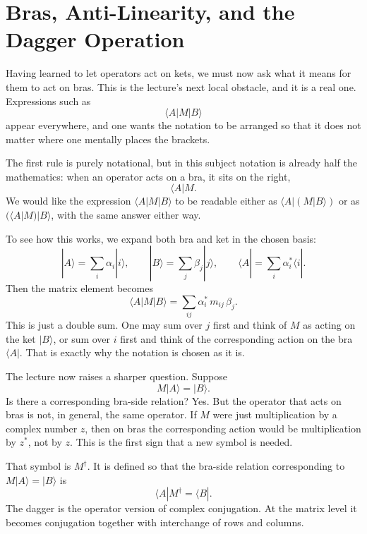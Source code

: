 \section{Bras, Anti-Linearity, and the Dagger Operation}

Having learned to let operators act on kets, we must now ask what it means for them to act on bras. This is the lecture's next local obstacle, and it is a real one. Expressions such as
\begin{equation}
\langle A|M|B\rangle
\end{equation}
appear everywhere, and one wants the notation to be arranged so that it does not matter where one mentally places the brackets.

The first rule is purely notational, but in this subject notation is already half the mathematics: when an operator acts on a bra, it sits on the right,
\begin{equation}
\langle A|M.
\end{equation}
We would like the expression \(\langle A|M|B\rangle\) to be readable either as \(\langle A|(M|B\rangle)\) or as \((\langle A|M)|B\rangle\), with the same answer either way.

To see how this works, we expand both bra and ket in the chosen basis:
\begin{equation}
|A\rangle=\sum_i \alpha_i |i\rangle,
\qquad
|B\rangle=\sum_j \beta_j |j\rangle,
\qquad
\langle A|=\sum_i \alpha_i^* \langle i|.
\end{equation}
Then the matrix element becomes
\begin{equation}
\langle A|M|B\rangle
=
\sum_{ij}\alpha_i^*\,m_{ij}\,\beta_j.
\end{equation}
This is just a double sum. One may sum over \(j\) first and think of \(M\) as acting on the ket \(|B\rangle\), or sum over \(i\) first and think of the corresponding action on the bra \(\langle A|\). That is exactly why the notation is chosen as it is.

The lecture now raises a sharper question. Suppose
\begin{equation}
M|A\rangle=|B\rangle.
\end{equation}
Is there a corresponding bra-side relation? Yes. But the operator that acts on bras is not, in general, the same operator. If \(M\) were just multiplication by a complex number \(z\), then on bras the corresponding action would be multiplication by \(z^*\), not by \(z\). This is the first sign that a new symbol is needed.

That symbol is \(M^\dagger\). It is defined so that the bra-side relation corresponding to \(M|A\rangle=|B\rangle\) is
\begin{equation}
\langle A|M^\dagger=\langle B|.
\end{equation}
The dagger is the operator version of complex conjugation. At the matrix level it becomes conjugation together with interchange of rows and columns.

